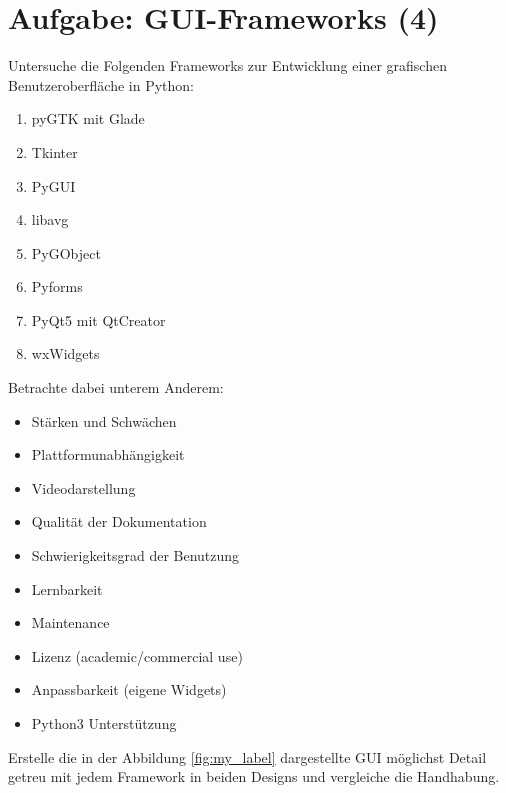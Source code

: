 \documentclass{article}
\begin{document}
\pagestyle{fancy}

\section{Aufgabe: GUI-Frameworks (4)}

Untersuche die Folgenden Frameworks zur Entwicklung einer grafischen Benutzeroberfläche in Python:
\begin{enumerate}
    \item pyGTK mit Glade
    \item Tkinter
    \item PyGUI
    \item libavg
    \item PyGObject
    \item Pyforms
    \item PyQt5 mit QtCreator
    \item wxWidgets
\end{enumerate}
Betrachte dabei unterem Anderem:
\begin{itemize}
    \item Stärken und Schwächen
    \item Plattformunabhängigkeit
    \item Videodarstellung
    \item Qualität der Dokumentation
    \item Schwierigkeitsgrad der Benutzung
    \item Lernbarkeit
    \item Maintenance
    \item Lizenz (academic/commercial use)
    \item Anpassbarkeit (eigene Widgets)
    \item Python3 Unterstützung
\end{itemize}
Erstelle die in der Abbildung \ref{fig:my_label} dargestellte GUI möglichst Detail getreu mit jedem Framework in beiden Designs und vergleiche die Handhabung.
\end{document}
